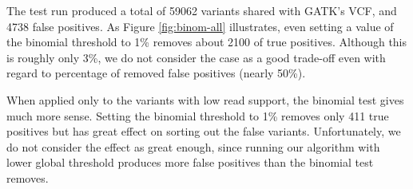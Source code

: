 The test run produced a total of 59062 variants shared with GATK's VCF, and 4738 false positives. As Figure \ref{fig:binom-all} illustrates, even setting a value of the binomial threshold to 1\% removes about 2100 of true positives. Although this is roughly only 3\%, we do not consider the case as a good trade-off even with regard to percentage of removed false positives (nearly 50\%). 

When applied only to the variants with low read support, the binomial test gives much more sense. Setting the binomial threshold to 1\% removes only 411 true positives but has great effect on sorting out the false variants. Unfortunately, we do not consider the effect as great enough, since running our algorithm with lower global threshold produces more false positives than the binomial test removes.
